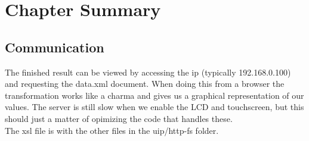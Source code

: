 \section{Chapter Summary}
\label{sec:SummaryDescription}
\subsection{Communication}
The finished result can be viewed by accessing the ip (typically 192.168.0.100) and requesting the data.xml document. When doing this from a browser the transformation works like a charma and gives us a graphical representation of our values. The server is still slow when we enable the LCD and touchscreen, but this should just a matter of opimizing the code that handles these.\\
The xsl file is with the other files in the uip/http-fs folder. 
